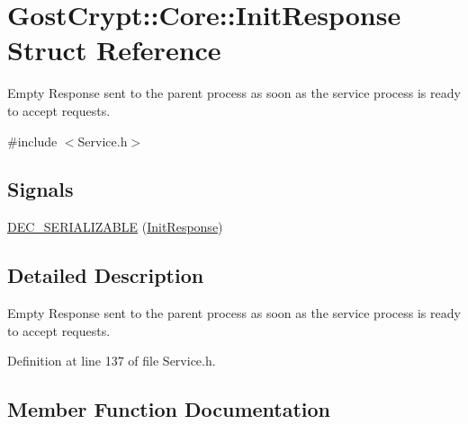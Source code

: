 \hypertarget{struct_gost_crypt_1_1_core_1_1_init_response}{}\section{Gost\+Crypt\+:\+:Core\+:\+:Init\+Response Struct Reference}
\label{struct_gost_crypt_1_1_core_1_1_init_response}


Empty Response sent to the parent process as soon as the service process is ready to accept requests.  




{\ttfamily \#include $<$Service.\+h$>$}

\subsection*{Signals}
\begin{DoxyCompactItemize}
\item 
\hyperlink{struct_gost_crypt_1_1_core_1_1_init_response_a68641287b2124b4e84a8bca840086051}{D\+E\+C\+\_\+\+S\+E\+R\+I\+A\+L\+I\+Z\+A\+B\+LE} (\hyperlink{struct_gost_crypt_1_1_core_1_1_init_response}{Init\+Response})
\end{DoxyCompactItemize}


\subsection{Detailed Description}
Empty Response sent to the parent process as soon as the service process is ready to accept requests. 

Definition at line 137 of file Service.\+h.



\subsection{Member Function Documentation}
\mbox{\label{struct_gost_crypt_1_1_core_1_1_init_response_a68641287b2124b4e84a8bca840086051}} 

